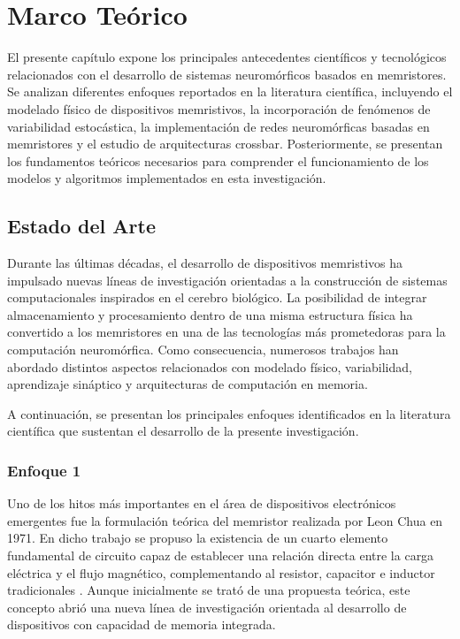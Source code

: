 \chapter{Marco Teórico}

El presente capítulo expone los principales antecedentes científicos y tecnológicos relacionados con el desarrollo de sistemas neuromórficos basados en memristores. Se analizan diferentes enfoques reportados en la literatura científica, incluyendo el modelado físico de dispositivos memristivos, la incorporación de fenómenos de variabilidad estocástica, la implementación de redes neuromórficas basadas en memristores y el estudio de arquitecturas crossbar. Posteriormente, se presentan los fundamentos teóricos necesarios para comprender el funcionamiento de los modelos y algoritmos implementados en esta investigación.

\section{Estado del Arte}

Durante las últimas décadas, el desarrollo de dispositivos memristivos ha impulsado nuevas líneas de investigación orientadas a la construcción de sistemas computacionales inspirados en el cerebro biológico. La posibilidad de integrar almacenamiento y procesamiento dentro de una misma estructura física ha convertido a los memristores en una de las tecnologías más prometedoras para la computación neuromórfica. Como consecuencia, numerosos trabajos han abordado distintos aspectos relacionados con modelado físico, variabilidad, aprendizaje sináptico y arquitecturas de computación en memoria.

A continuación, se presentan los principales enfoques identificados en la literatura científica que sustentan el desarrollo de la presente investigación.

\subsection{Enfoque 1}

Uno de los hitos más importantes en el área de dispositivos electrónicos emergentes fue la formulación teórica del memristor realizada por Leon Chua en 1971. En dicho trabajo se propuso la existencia de un cuarto elemento fundamental de circuito capaz de establecer una relación directa entre la carga eléctrica y el flujo magnético, complementando al resistor, capacitor e inductor tradicionales \cite{17}. Aunque inicialmente se trató de una propuesta teórica, este concepto abrió una nueva línea de investigación orientada al desarrollo de dispositivos con capacidad de memoria integrada.

